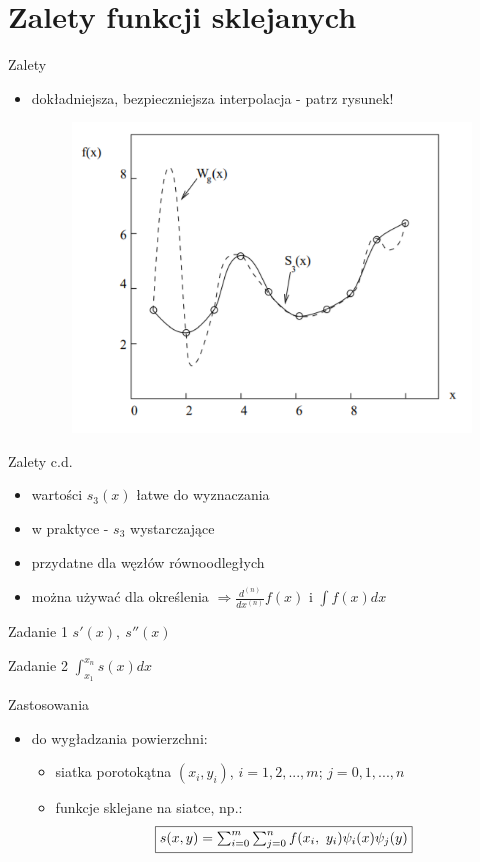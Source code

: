 ﻿\section{Zalety funkcji sklejanych}
\begin{frame}{Zalety}
	\begin{itemize}
	\item dokładniejsza, bezpieczniejsza interpolacja - patrz rysunek!
    \begin{figure}[h]
			\includegraphics[width=.75\linewidth]{img/4/spline_img_5}
		\end{figure}
	\end{itemize}
\end{frame}
\begin{frame}{Zalety c.d.}
	\begin{itemize}
		\item wartości $s_{3}(x)$ łatwe do wyznaczania
    	\item w praktyce - $s_{3}$ wystarczające
    	\item przydatne dla węzłów równoodległych
    	\item można używać dla określenia $\Rightarrow \frac{d^{(n)}}	
        	{dx^(n)}f(x)$
    		i $\int f(x)dx$ 
	\end{itemize}
	\begin{block}{Zadanie 1}
        	$s'(x), \ s''(x)$
    \end{block}
    \begin{block}{Zadanie 2}
        	$\int^{x_{n}}_{x_{1}}s(x)dx$
    \end{block}
\end{frame}
\begin{frame}{Zastosowania}
	\begin{itemize}
		\item do wygładzania powierzchni:
        	\begin{itemize}
        		\item siatka porotokątna $(x_{i},y_{i})$, $i=1,2,...,m$; 
                	$j=0,1,...,n$
                \item funkcje sklejane na siatce, np.: 
                \[
                	\framebox{$s(x,y)=\sum_{i=0}^{m}\sum_{j=0}^{n}f(x_{i},
                    \ y_{i})\psi_{i}(x)\psi_{j}(y)$}
                \]
        	\end{itemize}
	\end{itemize}
\end{frame}








